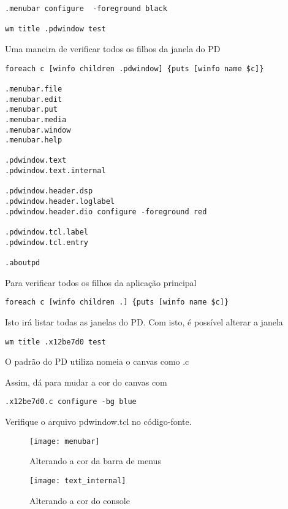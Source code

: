\begin{lstlisting}[Exemplo de alteração de menus do PD com Tcl]
.menubar configure  -foreground black

wm title .pdwindow test
\end{lstlisting}

Uma maneira de verificar  todos os filhos da janela do PD

\begin{lstlisting}
foreach c [winfo children .pdwindow] {puts [winfo name $c]}

.menubar.file
.menubar.edit
.menubar.put
.menubar.media
.menubar.window
.menubar.help

.pdwindow.text
.pdwindow.text.internal

.pdwindow.header.dsp
.pdwindow.header.loglabel
.pdwindow.header.dio configure -foreground red

.pdwindow.tcl.label
.pdwindow.tcl.entry

.aboutpd

\end{lstlisting}

Para verificar todos os filhos da aplicação principal

\begin{lstlisting}
foreach c [winfo children .] {puts [winfo name $c]}
\end{lstlisting}
Isto irá listar todas as janelas do PD.
Com isto, é possível alterar a janela

\begin{lstlisting}
wm title .x12be7d0 test
\end{lstlisting}

O padrão do PD utiliza nomeia o canvas como .c

Assim, dá para mudar a cor do canvas com 

\begin{lstlisting}
.x12be7d0.c configure -bg blue
\end{lstlisting}

Verifique o arquivo pdwindow.tcl no código-fonte.

\begin{figure}[ht!]
	\centering
	\texttt{[image: menubar]}
	\caption{Alterando a cor da barra de menus}
\end{figure}

\begin{figure}[ht!]
	\centering
	\texttt{[image: text\_internal]}
	\caption{Alterando a cor do console}
\end{figure}

